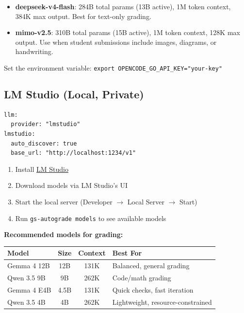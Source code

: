 \documentclass[11pt,a4paper]{article}
\begin{document}
\begin{itemize}[itemsep=2pt]
    \item \textbf{deepseek-v4-flash}: 284B total params (13B active), 1M token context, 384K max output. Best for text-only grading.
    \item \textbf{mimo-v2.5}: 310B total params (15B active), 1M token context, 128K max output. Use when student submissions include images, diagrams, or handwriting.
\end{itemize}

Set the environment variable: \texttt{export OPENCODE\_GO\_API\_KEY="your-key"}

\subsection{LM Studio (Local, Private)}

\begin{lstlisting}[style=yamlstyle]
llm:
  provider: "lmstudio"
lmstudio:
  auto_discover: true
  base_url: "http://localhost:1234/v1"
\end{lstlisting}

\begin{enumerate}[itemsep=3pt]
    \item Install \href{https://lmstudio.ai/}{LM Studio}
    \item Download models via LM Studio's UI
    \item Start the local server (Developer $\rightarrow$ Local Server $\rightarrow$ Start)
    \item Run \texttt{gs-autograde models} to see available models
\end{enumerate}

\textbf{Recommended models for grading:}

\begin{center}
\begin{tabular}{lccp{4cm}}
\toprule
\textbf{Model} & \textbf{Size} & \textbf{Context} & \textbf{Best For} \\
\midrule
Gemma 4 12B & 12B & 131K & Balanced, general grading \\
Qwen 3.5 9B & 9B & 262K & Code/math grading \\
Gemma 4 E4B & 4.5B & 131K & Quick checks, fast iteration \\
Qwen 3.5 4B & 4B & 262K & Lightweight, resource-constrained \\
\bottomrule
\end{tabular}
\end{center}
\end{document}
